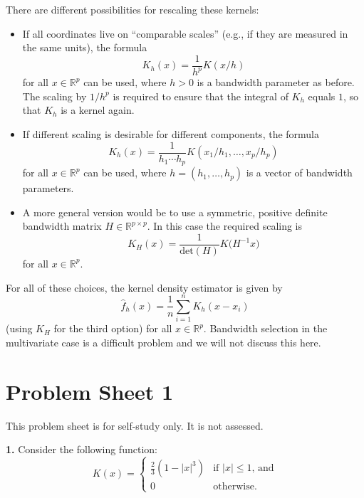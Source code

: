 \documentclass[
  a4paper,
]{article}
\theoremstyle{definition}
\theoremstyle{definition}
\theoremstyle{definition}
\theoremstyle{definition}
\theoremstyle{remark}
\begin{document}
There are different possibilities for rescaling these kernels:

\begin{itemize}
\item
  If all coordinates live on ``comparable scales'' (e.g., if they are
  measured in the same units), the formula
  \[ K_h(x) = \frac{1}{h^p} K(x/h) \]
  for all \(x\in\mathbb{R}^p\) can be used, where \(h>0\) is a bandwidth parameter
  as before. The scaling by \(1/h^p\) is required
  to ensure that the integral of \(K_h\) equals \(1\), so that \(K_h\) is
  a kernel again.
\item
  If different scaling is desirable for different components, the formula
  \begin{equation*}
    K_h(x)
    = \frac{1}{h_1 \cdots h_p} K(x_1/h_1, \ldots, x_p/h_p)
  \end{equation*}
  for all \(x\in\mathbb{R}^p\) can be used, where \(h = (h_1, \ldots, h_p)\) is a vector
  of bandwidth parameters.
\item
  A more general version would be to use a symmetric, positive definite
  bandwidth matrix \(H \in \mathbb{R}^{p\times p}\).
  In this case the required scaling is
  \begin{equation*}
    K_H(x)
    = \frac{1}{\mathrm{det}(H)} K\bigl( H^{-1} x \bigr)
  \end{equation*}
  for all \(x\in\mathbb{R}^p\).
\end{itemize}

For all of these choices, the kernel density estimator is given by
\begin{equation*}
  \hat f_h(x)
  = \frac{1}{n} \sum_{i=1}^n K_h(x - x_i)
\end{equation*}
(using \(K_H\) for the third option) for all \(x\in\mathbb{R}^p\).
Bandwidth selection in the multivariate case is a difficult problem
and we will not discuss this here.

\clearpage

\section*{Problem Sheet 1}\label{P01}

This problem sheet is for self-study only.
It is not assessed.

\textbf{1.} Consider the following function:
\begin{equation*}
K(x)
= \begin{cases}
  \frac23 (1 - |x|^3) & \mbox{if $|x|\leq 1$, and} \\
  0 & \text{otherwise}.
\end{cases}
\end{equation*}
\end{document}
